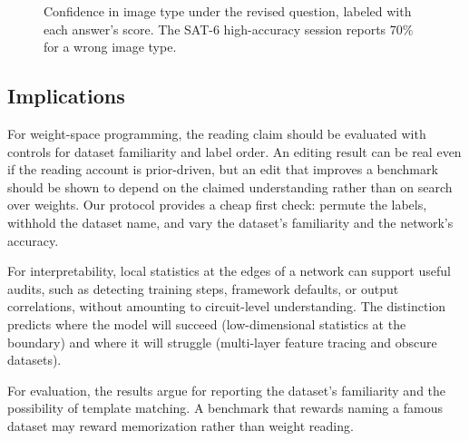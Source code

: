 \documentclass[11pt]{article}
\begin{document}
\begin{figure}[t]
  \centering
  \caption{Confidence in image type under the revised question, labeled with each answer's score. The SAT-6 high-accuracy session reports 70\% for a wrong image type.}
  \label{fig:confidence}
\end{figure}

\subsection{Implications}

For weight-space programming, the reading claim should be evaluated with controls for dataset familiarity and label order. An editing result can be real even if the reading account is prior-driven, but an edit that improves a benchmark should be shown to depend on the claimed understanding rather than on search over weights. Our protocol provides a cheap first check: permute the labels, withhold the dataset name, and vary the dataset's familiarity and the network's accuracy.

For interpretability, local statistics at the edges of a network can support useful audits, such as detecting training steps, framework defaults, or output correlations, without amounting to circuit-level understanding. The distinction predicts where the model will succeed (low-dimensional statistics at the boundary) and where it will struggle (multi-layer feature tracing and obscure datasets).

For evaluation, the results argue for reporting the dataset's familiarity and the possibility of template matching. A benchmark that rewards naming a famous dataset may reward memorization rather than weight reading.
\end{document}
